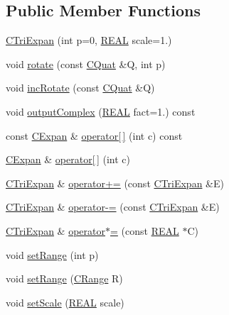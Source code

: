 \subsection*{Public Member Functions}
\begin{DoxyCompactItemize}
\item 
\hyperlink{classCTriExpan_ad90a00f11b5e8c8bfb16a244a81406d4}{C\-Tri\-Expan} (int p=0, \hyperlink{util_8h_a5821460e95a0800cf9f24c38915cbbde}{R\-E\-A\-L} scale=1.)
\item 
void \hyperlink{classCTriExpan_a6e55f787fa10d245b8a81abf6e1a2082}{rotate} (const \hyperlink{classCQuat}{C\-Quat} \&Q, int p)
\item 
void \hyperlink{classCTriExpan_a47cc8551e212cca521144e8f2619c42a}{inc\-Rotate} (const \hyperlink{classCQuat}{C\-Quat} \&Q)
\item 
void \hyperlink{classCTriExpan_ac2debbe18cecadb462b1573dcfd017cd}{output\-Complex} (\hyperlink{util_8h_a5821460e95a0800cf9f24c38915cbbde}{R\-E\-A\-L} fact=1.) const 
\item 
const \hyperlink{classCExpan}{C\-Expan} \& \hyperlink{classCTriExpan_a27cd9f0bf1f58b91d89d3c12c03525b2}{operator\mbox{[}$\,$\mbox{]}} (int c) const 
\item 
\hyperlink{classCExpan}{C\-Expan} \& \hyperlink{classCTriExpan_a1551ab9311355e9275b9204faedeee02}{operator\mbox{[}$\,$\mbox{]}} (int c)
\item 
\hyperlink{classCTriExpan}{C\-Tri\-Expan} \& \hyperlink{classCTriExpan_a4a1e6feaebf3ceaf75ff2c35390b2978}{operator+=} (const \hyperlink{classCTriExpan}{C\-Tri\-Expan} \&E)
\item 
\hyperlink{classCTriExpan}{C\-Tri\-Expan} \& \hyperlink{classCTriExpan_a3ab3ddc4c13f65923693417538c339a7}{operator-\/=} (const \hyperlink{classCTriExpan}{C\-Tri\-Expan} \&E)
\item 
\hyperlink{classCTriExpan}{C\-Tri\-Expan} \& \hyperlink{classCTriExpan_a916a6a734f5e00c9bad0c5fc9c32f1c5}{operator$\ast$=} (const \hyperlink{util_8h_a5821460e95a0800cf9f24c38915cbbde}{R\-E\-A\-L} $\ast$C)
\item 
void \hyperlink{classCTriExpan_ab78ef5bb64df3d2d497968dfaecf0583}{set\-Range} (int p)
\item 
void \hyperlink{classCTriExpan_a03f02560398adc694835232d3b4e8f8b}{set\-Range} (\hyperlink{classCRange}{C\-Range} R)
\item 
void \hyperlink{classCTriExpan_a51f47a9ae7f19a2558400c525e1716cd}{set\-Scale} (\hyperlink{util_8h_a5821460e95a0800cf9f24c38915cbbde}{R\-E\-A\-L} scale)

\end{DoxyCompactItemize}
